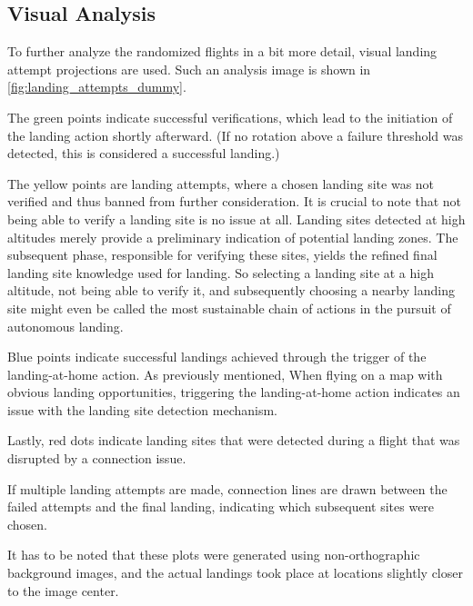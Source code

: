 \subsection{Visual Analysis}
To further analyze the randomized flights in a bit more detail, visual landing attempt projections are used. Such an analysis image is shown in \cref{fig:landing_attempts_dummy}.

The green points indicate successful verifications, which lead to the initiation of the landing action shortly afterward. (If no rotation above a failure threshold was detected, this is considered a successful landing.) 

The yellow points are landing attempts, where a chosen landing site was not verified and thus banned from further consideration. It is crucial to note that not being able to verify a landing site is no issue at all. Landing sites detected at high altitudes merely provide a preliminary indication of potential landing zones. The subsequent phase, responsible for verifying these sites, yields the refined final landing site knowledge used for landing. So selecting a landing site at a high altitude, not being able to verify it, and subsequently choosing a nearby landing site might even be called the most sustainable chain of actions in the pursuit of autonomous landing.

Blue points indicate successful landings achieved through the trigger of the landing-at-home action. As previously mentioned, When flying on a map with obvious landing opportunities, triggering the landing-at-home action indicates an issue with the landing site detection mechanism.

Lastly, red dots indicate landing sites that were detected during a flight that was disrupted by a connection issue.

If multiple landing attempts are made, connection lines are drawn between the failed attempts and the final landing, indicating which subsequent sites were chosen.

It has to be noted that these plots were generated using non-orthographic background images, and the actual landings took place at locations slightly closer to the image center.

